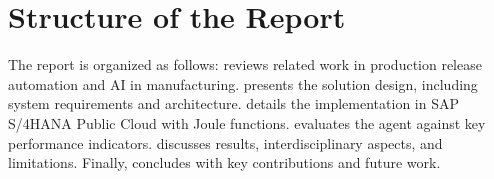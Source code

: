 \section{Structure of the Report}
The report is organized as follows: 
 reviews related work in production release automation and AI in manufacturing. 
 presents the solution design, including system requirements and architecture. 
 details the implementation in SAP S/4HANA Public Cloud with Joule functions. 
 evaluates the agent against key performance indicators. 
 discusses results, interdisciplinary aspects, and limitations. 
Finally,  concludes with key contributions and future work.
